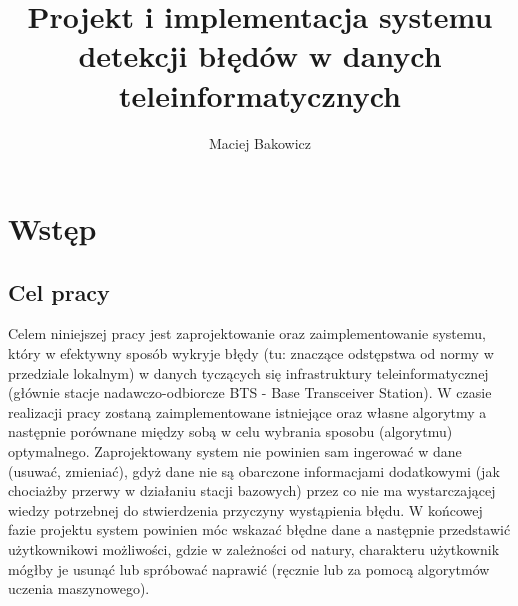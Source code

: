 \documentclass[eng,printmode]{mgr}
\title{Projekt i implementacja systemu detekcji błędów w danych teleinformatycznych}
\author{Maciej Bakowicz}
\begin{document}
\maketitle 

\tableofcontents 

\chapter{Wstęp}  
\section{Cel pracy}
Celem niniejszej pracy jest zaprojektowanie oraz zaimplementowanie systemu, który w efektywny sposób wykryje błędy (tu: znaczące odstępstwa od normy w przedziale lokalnym) w danych tyczących się infrastruktury teleinformatycznej (głównie stacje nadawczo-odbiorcze BTS - Base Transceiver Station). W czasie realizacji pracy zostaną zaimplementowane istniejące oraz własne algorytmy a następnie porównane między sobą w celu wybrania sposobu (algorytmu) optymalnego. Zaprojektowany system nie powinien sam ingerować w dane (usuwać, zmieniać), gdyż dane nie są obarczone informacjami dodatkowymi (jak chociażby przerwy w działaniu stacji bazowych) przez co nie ma wystarczającej wiedzy potrzebnej do stwierdzenia przyczyny wystąpienia błędu. W końcowej fazie projektu system powinien móc wskazać błędne dane a następnie przedstawić użytkownikowi możliwości, gdzie w zależności od natury, charakteru użytkownik mógłby je usunąć lub spróbować naprawić (ręcznie lub za pomocą algorytmów uczenia maszynowego). 
\end{document}
